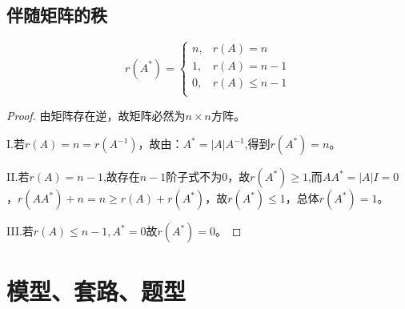 \subsection{伴随矩阵的秩}
$$ r(A^*)=\left\{
	\begin{aligned}
		n, & r(A)=n      \\
		1, & r(A)=n-1    \\
		0, & r(A)\le n-1 \\
	\end{aligned}
	\right.
$$
\begin{proof}
	由矩阵存在逆，故矩阵必然为$n\times n$方阵。

	I.若$r(A)=n=r(A^{-1})$，故由：$A^{*}=|A|A^{-1}$,得到$r(A^{*})=n$。

	II.若$r(A)=n-1$,故存在$n-1$阶子式不为0，故$r(A^*)\geq 1$,而$AA^*=|A|I=0$，$r(AA^*)+n=n\geq r(A)+r(A^*)$，故$r(A^*)\leq 1$，总体$r(A^*)=1$。

	III.若$r(A)\leq n-1,A^*=0$故$r(A^*)=0$。
\end{proof}

\section{模型、套路、题型}
